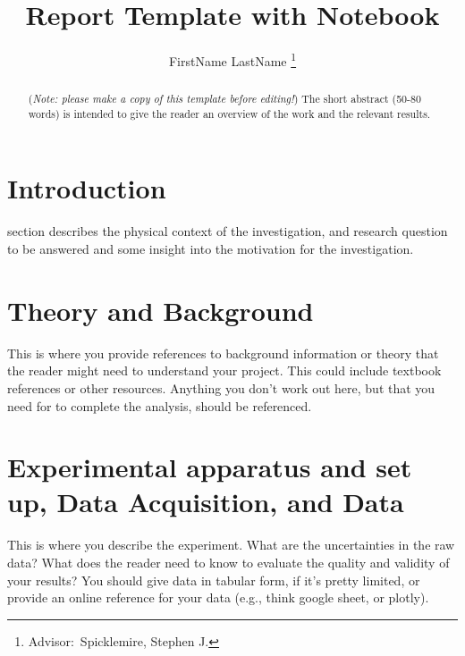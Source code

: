 \documentclass[journal, a4paper]{IEEEtran}
\begin{document}
	\title{Report Template with Notebook}
	\author{FirstName LastName
	\thanks{Advisor:~Spicklemire, Stephen J.}}
	\maketitle

\begin{abstract}
(\textit{Note: please make a copy of this template before editing!})	The short abstract (50-80 words) is intended to give the reader an overview of the work and the relevant results.
\end{abstract}

\section{Introduction}
	 section describes the physical context of the investigation, and research question to be answered and 
    some insight into the motivation for the investigation.
\section{Theory and Background}
	This is where you provide references to background information or theory that the reader might 
    need to understand your project. This could include textbook references or other
    resources. Anything you don't work out here, but that you need for to complete
    the analysis, should be referenced.

\section{Experimental apparatus and set up, Data Acquisition, and Data}
	This is where you describe the experiment. What are the uncertainties in the raw data? What does the reader need to know to evaluate the 
    quality and validity of your results? You should give data in tabular form, if it's pretty limited, or 
    provide an online reference for your data (e.g., think google sheet, or plotly).
    
\end{document}
